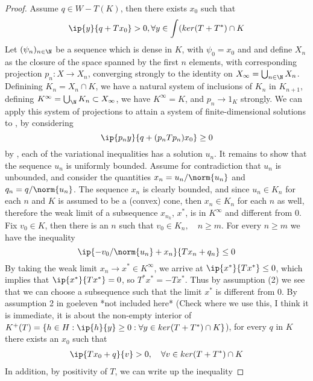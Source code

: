 \begin{proof}
	Assume $q \in W - T(K)$, then there exists $x_0$ such that
	\begin{equation}
		\label{eq:var_ineq}
		\ip{y}{q+Tx_0} > 0, \forall y \in \int(ker(T+T^*) \cap K
	\end{equation}
	Let $(\psi_n)_{n\in \N}$ be a sequence which is dense in $K$, with $\psi_0 = x_0$ and and define $X_n$ as the closure of the space spanned by the first $n$ elements, with corresponding projection $p_n: X \to X_n$, converging strongly to the identity on $X_{\infty} = \bigcup_{n \in \N} X_n$. Definining $K_n = X_n \cap K$, we have a natural system of inclusions of $K_n$ in $K_{n+1}$, defining $K^\infty = \bigcup_{\N} K_n \subset X_\infty$, we have $K^\infty = K$, and $p_n \to 1_K$ strongly. We can apply this system of projections to attain a system of finite-dimensional solutions to , by considering
\begin{equation}
	\ip{p_n y}{q+(p_nTp_n) x_0} \geq 0
\end{equation}
by , each of the variational inequalities has a solution $u_n$. It remains to show that the sequence $u_n$ is uniformly bounded. Assume for contradiction that $u_n$ is unbounded, and consider the quantities $x_n = u_n/\norm{u_n}$ and $q_n = q / \norm{u_n}$. The sequence $x_n$ is clearly bounded, and since $u_n \in K_n$ for each $n$ and $K$ is assumed to be a (convex) cone, then $x_n \in K_n$ for each $n$ as well, therefore the weak limit of a subsequence $x_{n_k}$, $x^*$, is in $K^\infty$ and different from 0. Fix $v_0 \in K$, then there is an $n$ such that $v_0 \in K_n,\quad n \geq m$. For every $n \geq m$ we have the inequality
\begin{equation}
	\ip{-v_0/\norm{u_n}+x_n}{Tx_n+q_n} \leq 0
\end{equation}
By taking the weak limit $x_n \to x^* \in K^\infty$, we arrive at $\ip{x^*}{Tx^*} \leq 0$, which implies that $\ip{x^*}{Tx^*}=0$, so $T^*x^* = - Tx^*$. Thus by assumption (2) we see that we can choose a subsequence such that the limit $x^*$ is different from 0.  By assumption 2 in goeleven *not included here* (Check where we use this, I think it is immediate, it is about the non-empty interior of $K^+(T) =\{h\in H : \ip{h}{y} \geq 0 : \forall y \in ker(T+T^*) \cap K\} $), for every $q$ in $K$ there exists an $x_0$ such that
\begin{align*}
	\ip{Tx_0+q}{v} > 0, \quad \forall v \in ker(T+T^*)\cap K
\end{align*}
In addition, by positivity of $T$, we can write up the inequality

\end{proof}
